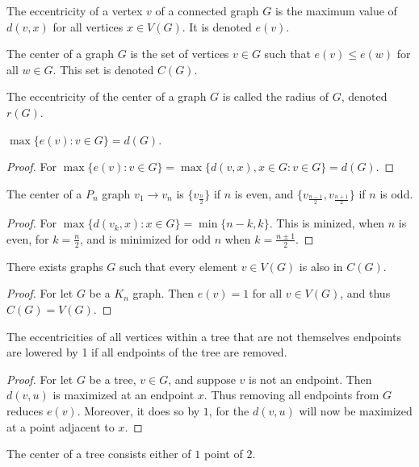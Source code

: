 \documentclass[crop=false,class=book,oneside]{standalone}
\begin{document}
\begin{definition}
The eccentricity of a vertex $v$ of a connected graph $G$ is the maximum value of $d(v,x)$ for all vertices $x\in V(G)$. It is denoted $e(v)$.
\end{definition}
\begin{definition}
The center of a graph $G$ is the set of vertices $v\in G$ such that $e(v) \leq e(w)$ for all $w\in G$. This set is denoted $C(G)$.
\end{definition}
\begin{definition}
The eccentricity of the center of a graph $G$ is called the radius of $G$, denoted $r(G)$.
\end{definition}
\begin{corollary}
$\max\{e(v):v\in G\}= d(G)$.
\end{corollary}
\begin{proof}
For $\max\{e(v):v\in G\} = \max\{d(v,x), x\in G:v\in G\} = d(G)$.
\end{proof}
\begin{corollary}
The center of a $P_n$ graph $v_1\rightarrow v_n$ is $\{v_\frac{n}{2}\}$ if $n$ is even, and $\{v_{\frac{n-1}{2}},v_{\frac{n+1}{2}}\}$ if $n$ is odd.
\end{corollary}
\begin{proof}
For $\max\{d(v_k,x):x\in G\} = \min\{n-k,k\}$. This is minized, when $n$ is even, for $k= \frac{n}{2}$, and is minimized for odd $n$ when $k=\frac{n\pm 1}{2}$.
\end{proof}
\begin{corollary}
There exists graphs $G$ such that every element $v\in V(G)$ is also in $C(G)$.
\end{corollary}
\begin{proof}
For let $G$ be a $K_n$ graph. Then $e(v) = 1$ for all $v\in V(G)$, and thus $C(G) = V(G)$.
\end{proof}
\begin{corollary}
The eccentricities of all vertices within a tree that are not themselves endpoints are lowered by 1 if all endpoints of the tree are removed.
\end{corollary}
\begin{proof}
For let $G$ be a tree, $v\in G$, and suppose $v$ is not an endpoint. Then $d(v,u)$ is maximized at an endpoint $x$. Thus removing all endpoints from $G$ reduces $e(v)$. Moreover, it does so by $1$, for the $d(v,u)$ will now be maximized at a point adjacent to $x$.
\end{proof}
\begin{theorem}
The center of a tree consists either of $1$ point of $2$.
\end{theorem}
\end{document}
